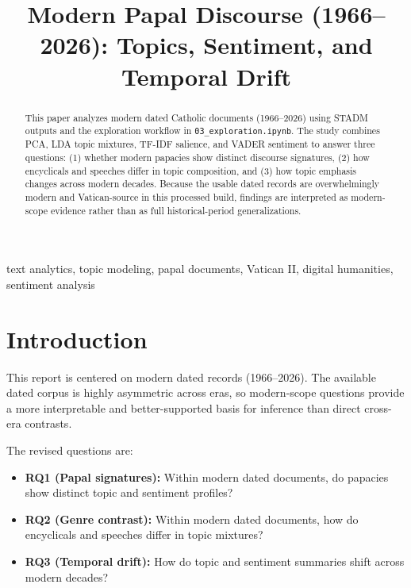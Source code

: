 \documentclass[conference]{IEEEtran}
\begin{document}
\graphicspath{{../output/figures/}}

\title{Modern Papal Discourse (1966--2026): Topics, Sentiment, and Temporal Drift}

\author{
}

\maketitle

\begin{abstract}
This paper analyzes modern dated Catholic documents (1966--2026) using STADM outputs and the exploration workflow in \texttt{03\_exploration.ipynb}. The study combines PCA, LDA topic mixtures, TF-IDF salience, and VADER sentiment to answer three questions: (1) whether modern papacies show distinct discourse signatures, (2) how encyclicals and speeches differ in topic composition, and (3) how topic emphasis changes across modern decades. Because the usable dated records are overwhelmingly modern and Vatican-source in this processed build, findings are interpreted as modern-scope evidence rather than as full historical-period generalizations.
\end{abstract}

\begin{IEEEkeywords}
text analytics, topic modeling, papal documents, Vatican II, digital humanities, sentiment analysis
\end{IEEEkeywords}

\section{Introduction}
This report is centered on modern dated records (1966--2026). The available dated corpus is highly asymmetric across eras, so modern-scope questions provide a more interpretable and better-supported basis for inference than direct cross-era contrasts.

The revised questions are:
\begin{itemize}
\item \textbf{RQ1 (Papal signatures):} Within modern dated documents, do papacies show distinct topic and sentiment profiles?
\item \textbf{RQ2 (Genre contrast):} Within modern dated documents, how do encyclicals and speeches differ in topic mixtures?
\item \textbf{RQ3 (Temporal drift):} How do topic and sentiment summaries shift across modern decades?
\end{itemize}
\end{document}
